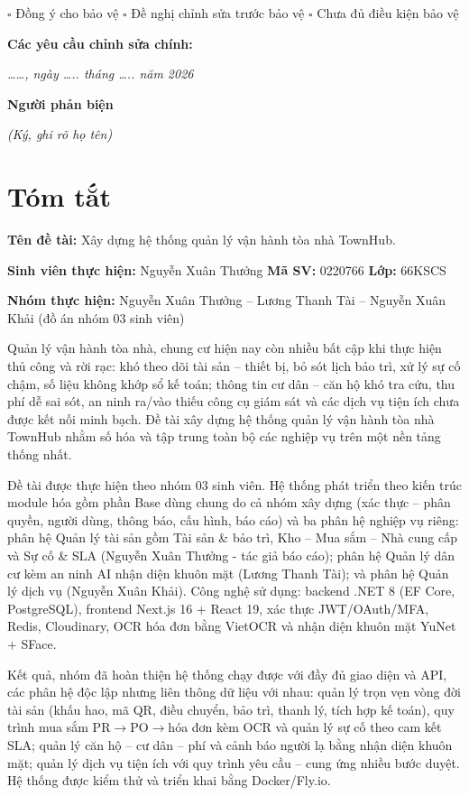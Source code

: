 $\square$ Đồng ý cho bảo vệ          $\square$ Đề nghị chỉnh sửa trước bảo vệ          $\square$ Chưa đủ điều kiện bảo vệ

\textbf{Các yêu cầu chỉnh sửa chính:}

\textit{\ldots{}\ldots{}, ngày \ldots{}.. tháng \ldots{}.. năm 2026}

\textbf{Người phản biện}

\textit{(Ký, ghi rõ họ tên)}

\chapter*{Tóm tắt}
\textbf{Tên đề tài: }Xây dựng hệ thống quản lý vận hành tòa nhà TownHub.

\textbf{Sinh viên thực hiện: }Nguyễn Xuân Thưởng   \textbf{Mã SV: }0220766   \textbf{Lớp: }66KSCS

\textbf{Nhóm thực hiện: }Nguyễn Xuân Thưởng – Lương Thanh Tài – Nguyễn Xuân Khải (đồ án nhóm 03 sinh viên)

Quản lý vận hành tòa nhà, chung cư hiện nay còn nhiều bất cập khi thực hiện thủ công và rời rạc: khó theo dõi tài sản – thiết bị, bỏ sót lịch bảo trì, xử lý sự cố chậm, số liệu không khớp sổ kế toán; thông tin cư dân – căn hộ khó tra cứu, thu phí dễ sai sót, an ninh ra/vào thiếu công cụ giám sát và các dịch vụ tiện ích chưa được kết nối minh bạch. Đề tài xây dựng hệ thống quản lý vận hành tòa nhà TownHub nhằm số hóa và tập trung toàn bộ các nghiệp vụ trên một nền tảng thống nhất.

Đề tài được thực hiện theo nhóm 03 sinh viên. Hệ thống phát triển theo kiến trúc module hóa gồm phần Base dùng chung do cả nhóm xây dựng (xác thực – phân quyền, người dùng, thông báo, cấu hình, báo cáo) và ba phân hệ nghiệp vụ riêng: phân hệ Quản lý tài sản gồm Tài sản \& bảo trì, Kho – Mua sắm – Nhà cung cấp và Sự cố \& SLA (Nguyễn Xuân Thưởng - tác giả báo cáo); phân hệ Quản lý dân cư kèm an ninh AI nhận diện khuôn mặt (Lương Thanh Tài); và phân hệ Quản lý dịch vụ (Nguyễn Xuân Khải). Công nghệ sử dụng: backend .NET 8 (EF Core, PostgreSQL), frontend Next.js 16 + React 19, xác thực JWT/OAuth/MFA, Redis, Cloudinary, OCR hóa đơn bằng VietOCR và nhận diện khuôn mặt YuNet + SFace.

Kết quả, nhóm đã hoàn thiện hệ thống chạy được với đầy đủ giao diện và API, các phân hệ độc lập nhưng liên thông dữ liệu với nhau: quản lý trọn vẹn vòng đời tài sản (khấu hao, mã QR, điều chuyển, bảo trì, thanh lý, tích hợp kế toán), quy trình mua sắm PR$\rightarrow$PO$\rightarrow$hóa đơn kèm OCR và quản lý sự cố theo cam kết SLA; quản lý căn hộ – cư dân – phí và cảnh báo người lạ bằng nhận diện khuôn mặt; quản lý dịch vụ tiện ích với quy trình yêu cầu – cung ứng nhiều bước duyệt. Hệ thống được kiểm thử và triển khai bằng Docker/Fly.io.


